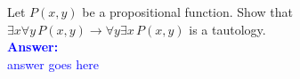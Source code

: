 \item{}
Let $P(x,y)$ be a propositional function. Show that $\exists x\forall y\,P(x,y)
\to \forall y\exists x\,P(x,y)$ is a tautology.\\[12pt]
\ifanswers
\textcolor{blue}{
\textbf{Answer:}\\[6pt]
answer goes here
}
\newpage
\fi
